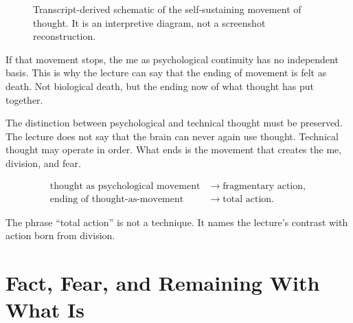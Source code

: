 \begin{figure}
\centering
{}

Transcript-derived schematic of the self-sustaining movement of thought. It is an interpretive diagram, not a screenshot reconstruction.
\end{figure}

If that movement stops, the me as psychological continuity has no independent basis. This is why the lecture can say that the ending of movement is felt as death. Not biological death, but the ending now of what thought has put together.

The distinction between psychological and technical thought must be preserved. The lecture does not say that the brain can never again use thought. Technical thought may operate in order. What ends is the movement that creates the me, division, and fear.

\begin{align}
\text{thought as psychological movement}
&\longrightarrow
\text{fragmentary action}, \\
\text{ending of thought-as-movement}
&\longrightarrow
\text{total action}.
\end{align}

The phrase ``total action'' is not a technique. It names the lecture's contrast with action born from division.

\section{Fact, Fear, and Remaining With What Is}

